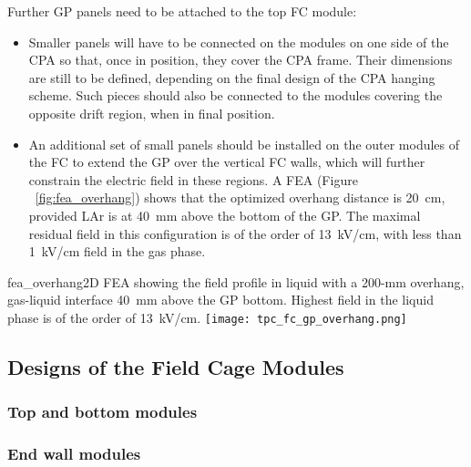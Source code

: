 Further GP panels need to be attached to the top FC module:
\begin{itemize}
\item Smaller panels will have to be connected on the modules on one side of the CPA so that, once in position, they %
cover the CPA frame. Their dimensions are %
still to be defined, depending on the final design of the CPA hanging scheme. Such  pieces should also be connected to the modules covering the opposite drift region, when in final position.
\item An additional %
set of small panels should be installed on the outer modules of the FC to extend the GP over the vertical FC walls, which will %
further constrain the electric field in these regions. A FEA (Figure ~\ref{fig:fea_overhang}) shows that the optimized overhang distance is 20~cm, provided LAr is at 40~mm above the bottom of the GP. The maximal residual field in this configuration is of the order of 13~kV/cm, with less than 1~kV/cm field in the gas phase.
\end{itemize}

\begin{cdrfigure}{fea_overhang}{2D FEA showing the field profile in liquid with a 200-mm overhang, gas-liquid interface 40~mm above the GP bottom. Highest field in the liquid phase is of the order of 13~kV/cm.}
\texttt{[image: tpc\_fc\_gp\_overhang.png]}
\end{cdrfigure}







\subsection{Designs of the Field Cage Modules}

\subsubsection{Top and bottom modules}




\subsubsection{End wall modules}

